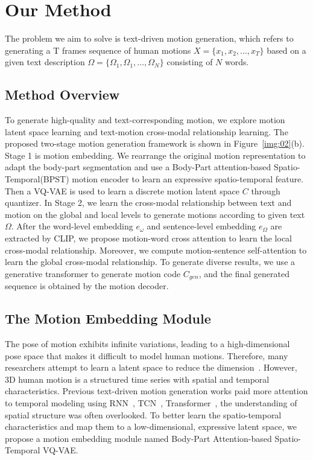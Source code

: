 \documentclass[10pt,twocolumn,letterpaper]{article}
\begin{document}
\section{Our Method}
The problem we aim to solve is text-driven motion generation, which refers to generating a T frames sequence of human motions $X=\{x_1,x_2,...,x_T\}$ based on a given text description $\Omega=\{\Omega_1,\Omega_1,...,\Omega_N\}$ consisting of $N$ words.

\subsection{Method Overview}
To generate high-quality and text-corresponding motion, we explore motion latent space learning and text-motion cross-modal relationship learning. The proposed two-stage motion generation framework is shown in Figure~\ref{img:02}(b).
Stage 1 is motion embedding. We rearrange the original motion representation to adapt the body-part segmentation and use a Body-Part attention-based Spatio-Temporal(BPST) motion encoder to learn an expressive spatio-temporal feature. Then a VQ-VAE is used to learn a discrete motion latent space $C$ through quantizer. In Stage 2, we learn the cross-modal relationship between text and motion on the global and local levels to generate motions according to given text $\Omega$. After the word-level embedding $e_\omega$ and sentence-level embedding $e_\Omega$ are extracted by CLIP, we propose motion-word cross attention to learn the local cross-modal relationship. Moreover, we compute motion-sentence self-attention to learn the global cross-modal relationship. To generate diverse results, we use a generative transformer to generate motion code $C_{gen}$, and the final generated sequence is obtained by the motion decoder.
 

\subsection{The Motion Embedding Module}
The pose of motion exhibits infinite variations, leading to a high-dimensional pose space that makes it difficult to model human motions. Therefore, many researchers attempt to learn a latent space to reduce the dimension~\cite{guo2022generating,chen2023mld,zhang2023t2m}. However, 3D human motion is a structured time series with spatial and temporal characteristics. Previous text-driven motion generation works paid more attention to temporal modeling using RNN~\cite{guo2020action2motion}, TCN~\cite{guo2022generating,zhang2023t2m}, Transformer~\cite{petrovich2022temos}, the understanding of spatial structure was often overlooked. To better learn the spatio-temporal characteristics and map them to a low-dimensional, expressive latent space, we propose a motion embedding module named Body-Part Attention-based Spatio-Temporal VQ-VAE.
\end{document}
